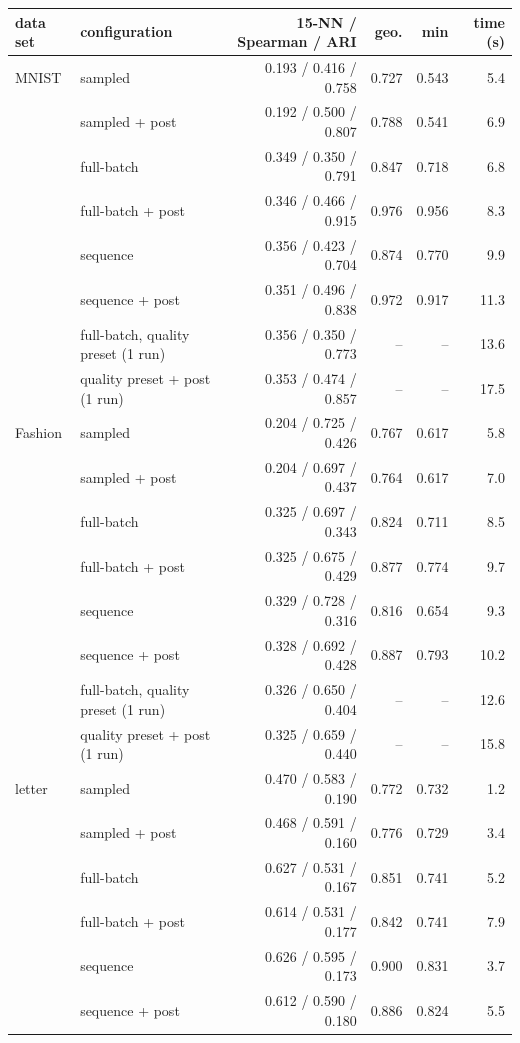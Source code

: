 \begin{tabular}{llrrrr}
\toprule
data set & configuration & 15-NN / Spearman / ARI & geo. & min & time (s) \\
\midrule
MNIST & sampled & 0.193 / 0.416 / 0.758 & 0.727 & 0.543 & 5.4 \\
 & sampled + post & 0.192 / 0.500 / 0.807 & 0.788 & 0.541 & 6.9 \\
 & full-batch & 0.349 / 0.350 / 0.791 & 0.847 & 0.718 & 6.8 \\
 & full-batch + post & 0.346 / 0.466 / 0.915 & 0.976 & 0.956 & 8.3 \\
 & sequence & 0.356 / 0.423 / 0.704 & 0.874 & 0.770 & 9.9 \\
 & sequence + post & 0.351 / 0.496 / 0.838 & 0.972 & 0.917 & 11.3 \\
 & full-batch, quality preset (1 run) & 0.356 / 0.350 / 0.773 & -- & -- & 13.6 \\
 & quality preset + post (1 run) & 0.353 / 0.474 / 0.857 & -- & -- & 17.5 \\
\midrule
Fashion & sampled & 0.204 / 0.725 / 0.426 & 0.767 & 0.617 & 5.8 \\
 & sampled + post & 0.204 / 0.697 / 0.437 & 0.764 & 0.617 & 7.0 \\
 & full-batch & 0.325 / 0.697 / 0.343 & 0.824 & 0.711 & 8.5 \\
 & full-batch + post & 0.325 / 0.675 / 0.429 & 0.877 & 0.774 & 9.7 \\
 & sequence & 0.329 / 0.728 / 0.316 & 0.816 & 0.654 & 9.3 \\
 & sequence + post & 0.328 / 0.692 / 0.428 & 0.887 & 0.793 & 10.2 \\
 & full-batch, quality preset (1 run) & 0.326 / 0.650 / 0.404 & -- & -- & 12.6 \\
 & quality preset + post (1 run) & 0.325 / 0.659 / 0.440 & -- & -- & 15.8 \\
\midrule
letter & sampled & 0.470 / 0.583 / 0.190 & 0.772 & 0.732 & 1.2 \\
 & sampled + post & 0.468 / 0.591 / 0.160 & 0.776 & 0.729 & 3.4 \\
 & full-batch & 0.627 / 0.531 / 0.167 & 0.851 & 0.741 & 5.2 \\
 & full-batch + post & 0.614 / 0.531 / 0.177 & 0.842 & 0.741 & 7.9 \\
 & sequence & 0.626 / 0.595 / 0.173 & 0.900 & 0.831 & 3.7 \\
 & sequence + post & 0.612 / 0.590 / 0.180 & 0.886 & 0.824 & 5.5 \\

\end{tabular}
